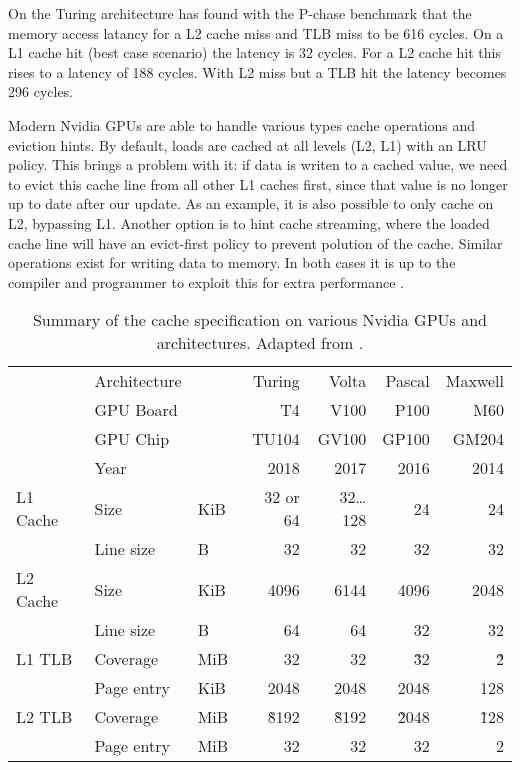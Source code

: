 On the Turing architecture \citeauthor{jia2019dissecting} has found with the P-chase benchmark that the memory access latancy for a L2 cache miss and TLB miss to be 616 cycles.
On a L1 cache hit (best case scenario) the latency is 32 cycles.
For a L2 cache hit this rises to a latency of 188 cycles.
With L2 miss but a TLB hit the latency becomes 296 cycles.

Modern Nvidia GPUs are able to handle various types cache operations and eviction hints.
By default, loads are cached at all levels (L2, L1) with an LRU policy.
This brings a problem with it: if data is writen to a cached value, we need to evict this cache line from all other L1 caches first, since that value is no longer up to date after our update.
As an example, it is also possible to only cache on L2, bypassing L1.
Another option is to hint cache streaming, where the loaded cache line will have an evict-first policy to prevent polution of the cache.
Similar operations exist for writing data to memory.
In both cases it is up to the compiler and programmer to exploit this for extra performance \cite{nvidia2021cudadocs}.


\begin{table}
    \centering
    \begin{tabular}{l l l|r r r r}
        & Architecture & &    Turing &      Volta & Pascal & Maxwell
        \\
        & GPU Board    & &        T4 &       V100 &   P100 &     M60
        \\
        & GPU Chip     & &     TU104 &      GV100 &  GP100 &   GM204
        \\
        & Year         & &      2018 &       2017 &   2016 &    2014
        \\
        \hline
        L1 Cache%
        & Size     & KiB &  32 or 64 & 32\dots128 &     24 &      24
        \\
        & Line size  & B &        32 &         32 &     32 &      32
        \\
        \hline
        L2 Cache%
        & Size     & KiB &      4096 &      6144 &   4096 &    2048
        \\
        & Line size  & B &        64 &        64 &     32 &      32
        \\
        \hline
        L1 TLB%
        & Coverage   & MiB &      32 &        32 &   \~32 &     \~2
        \\
        & Page entry & KiB &    2048 &    2048   &   2048 &     128
        \\
        \hline
        L2 TLB%
        & Coverage   & MiB &  \~8192 &  \~8192   & \~2048 &   \~128
        \\
        & Page entry & MiB &      32 &      32   &     32 &       2
    \end{tabular}
    \caption{
        Summary of the cache specification on various Nvidia GPUs and architectures. 
        Adapted from \citeauthor{jia2019dissecting}\cite{jia2019dissecting}.
    }
\end{table}

